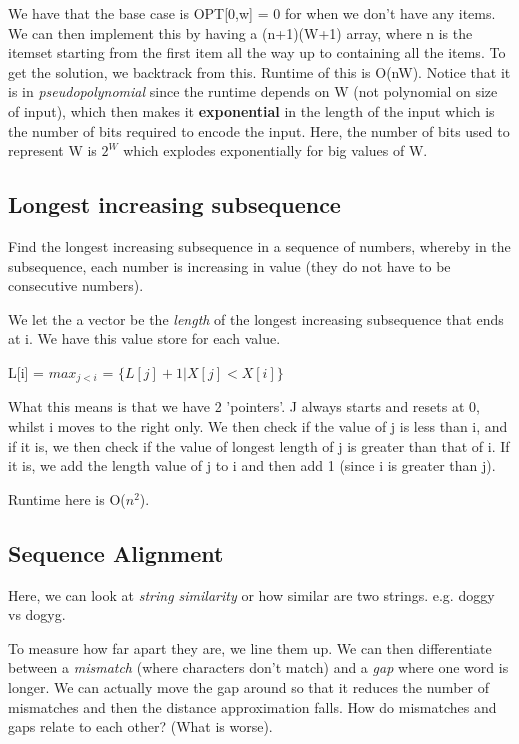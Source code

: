 \documentclass[11pt, oneside]{article}
\theoremstyle{definition}
\begin{document}
We have that the base case is OPT[0,w] = 0 for when we don't have any items. We can then implement this by having a (n+1)(W+1) array, where n is the itemset starting from the first item all the way up to containing all the items. To get the solution, we backtrack from this. Runtime of this is O(nW). Notice that it is in \textit{pseudopolynomial} since the runtime depends on W (not polynomial on size of input), which then makes it \textbf{exponential} in the length of the input which is the number of bits required to encode the input. Here, the number of bits used to represent W is $2^W$ which explodes exponentially for big values of W.

\subsection{Longest increasing subsequence}
Find the longest increasing subsequence in a sequence of numbers, whereby in the subsequence, each number is increasing in value (they do not have to be consecutive numbers).

We let the a vector be the \textit{length} of the longest increasing subsequence that ends at i. We have this value store for each value.

\begin{center}
  L[i] = $max_{j < i}$ = $\{L[j] + 1 | X[j] < X[i]\}$
\end{center}
What this means is that we have 2 'pointers'. J always starts and resets at 0, whilst i moves to the right only. We then check if the value of j is less than i, and if it is, we then check if the value of longest length of j is greater than that of i. If it is, we add the length value of j to i and then add 1 (since i is greater than j).

Runtime here is O($n^2$).

\subsection{Sequence Alignment}
Here, we can look at \textit{string similarity} or how similar are two strings. e.g. doggy vs dogyg.

To measure how far apart they are, we line them up. We can then differentiate between a \textit{mismatch} (where characters don't match) and a \textit{gap} where one word is longer. We can actually move the gap around so that it reduces the number of mismatches and then the distance approximation falls. How do mismatches and gaps relate to each other? (What is worse).
\end{document}
